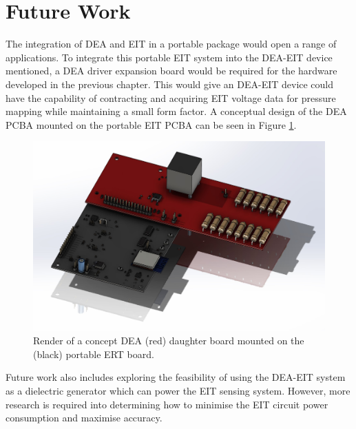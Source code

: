 \section{Future Work}
The integration of DEA and EIT in a portable package would open a range of applications. To integrate this portable EIT system into the DEA-EIT device mentioned, a DEA driver expansion board would be required for the hardware developed in the previous chapter. This would give an DEA-EIT device could have the capability of contracting and acquiring EIT voltage data for pressure mapping while maintaining a small form factor. A conceptual design of the DEA PCBA mounted on the portable EIT PCBA can be seen in Figure \ref{fig:DEA-EIT_draft_pcb_assy}. 
\begin{figure}[H]
	\centering
	\includegraphics[width=0.55\linewidth]{Figures/DEA-ERT_daughter_board_concept2.jpg}
	\caption{Render of a concept DEA (red) daughter board mounted on the (black) portable ERT board.}
	\label{fig:DEA-EIT_draft_pcb_assy}
\end{figure}
Future work also includes exploring the feasibility of using the DEA-EIT system as a dielectric generator which can power the EIT sensing system. However, more research is required into determining how to minimise the EIT circuit power consumption and maximise accuracy.

